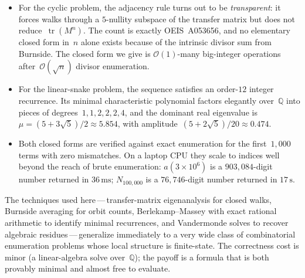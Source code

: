 \documentclass[11pt,a4paper]{article}
\newcommand{\SI}[2]{#1\,#2}
\newcommand{\milli}[0]{\text{m}}
\newcommand{\second}[0]{\text{s}}
\theoremstyle{definition}
\theoremstyle{plain}
\DeclareMathOperator{\tr}{tr}
\newcommand{\Q}{\mathbb{Q}}
\newcommand{\bigo}{\mathcal{O}}
\begin{document}
\begin{itemize}
\item For the cyclic problem, the adjacency rule turns out to be
\emph{transparent}: it forces walks through a $5$-nullity subspace of the
transfer matrix but does not reduce~$\tr(M^n)$.  The count is exactly
OEIS~A053656, and no elementary closed form in~$n$ alone exists because
of the intrinsic divisor sum from Burnside.  The closed form we give is
$\bigo(1)$-many big-integer operations after~$\bigo(\sqrt n)$ divisor
enumeration.
\item For the linear-snake problem, the sequence satisfies an order-$12$
integer recurrence.  Its minimal characteristic polynomial factors
elegantly over~$\Q$ into pieces of degrees~$1, 1, 2, 2, 2, 4$, and the
dominant real eigenvalue is~$\mu = (5+3\sqrt 5)/2 \approx 5.854$, with
amplitude~$(5+2\sqrt 5)/20 \approx 0.474$.
\item Both closed forms are verified against exact enumeration for the
first~$1{,}000$ terms with zero mismatches.  On a laptop CPU they scale
to indices well beyond the reach of brute enumeration:
$a(3 \times 10^6)$ is a $903{,}084$-digit number returned in
$\SI{36}{\milli\second}$; $N_{100{,}000}$ is a $76{,}746$-digit number
returned in $\SI{17}{\second}$.
\end{itemize}

The techniques used here\,---\,transfer-matrix eigenanalysis for closed walks,
Burnside averaging for orbit counts, Berlekamp--Massey with exact
rational arithmetic to identify minimal recurrences, and Vandermonde
solves to recover algebraic residues\,---\,generalize immediately to a very
wide class of combinatorial enumeration problems whose local structure is
finite-state.  The correctness cost is minor (a linear-algebra solve
over~$\Q$); the payoff is a formula that is both provably minimal and
almost free to evaluate.
\end{document}

